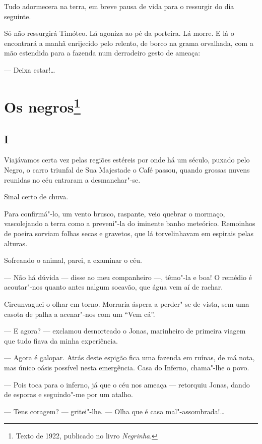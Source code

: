 Tudo adormecera na terra, em breve pausa de vida para o ressurgir do dia
seguinte.

Só não ressurgirá Timóteo. Lá agoniza ao pé da porteira. Lá morre. E lá
o encontrará a manhã enrijecido pelo relento, de borco na grama
orvalhada, com a mão estendida para a fazenda num derradeiro gesto de
ameaça:

--- Deixa estar!\ldots{}

\chapter{Os negros\footnote[*]{Texto de 1922, publicado no livro \emph{Negrinha}.}}

\section*{I}

\noindent{}Viajávamos certa vez pelas regiões estéreis por onde há um século,
puxado pelo Negro, o carro triunfal de Sua Majestade o Café passou,
quando grossas nuvens reunidas no céu entraram a desmanchar"-se.

Sinal certo de chuva.

Para confirmá"-lo, um vento brusco, raspante, veio quebrar o mormaço,
vascolejando a terra como a preveni"-la do iminente banho meteórico.
Remoinhos de poeira sorviam folhas secas e gravetos, que lá
torvelinhavam em espirais pelas alturas.

Sofreando o animal, parei, a examinar o céu.

--- Não há dúvida --- disse ao meu companheiro ---, têmo"-la e boa! O
remédio é acoutar"-nos quanto antes nalgum socavão, que água vem aí de
rachar.

Circunvaguei o olhar em torno. Morraria áspera a perder"-se de vista, sem
uma casota de palha a acenar"-nos com um ``Vem cá''.

--- E agora? --- exclamou desnorteado o Jonas, marinheiro de primeira
viagem que tudo fiava da minha experiência.

--- Agora é galopar. Atrás deste espigão fica uma fazenda em ruínas, de
má nota, mas único oásis possível nesta emergência. Casa do Inferno,
chama"-lhe o povo.

--- Pois toca para o inferno, já que o céu nos ameaça --- retorquiu
Jonas, dando de esporas e seguindo"-me por um atalho.

--- Tens coragem? --- gritei"-lhe. --- Olha que é casa mal"-assombrada!\ldots{}


